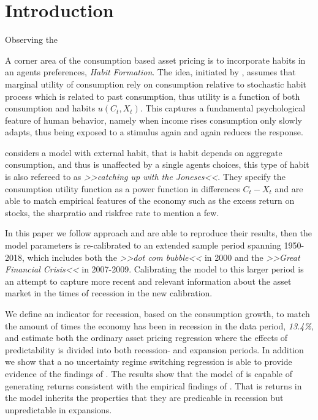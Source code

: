 \section{Introduction} \label{sec:Introduction}

Observing the 


A corner area of the consumption based asset pricing is to incorporate habits in an agents preferences, \textit{Habit Formation}. The idea, initiated by \citet{Constantinides_1990}, assumes that marginal utility of consumption rely on consumption relative to stochastic habit process which is related to past consumption, thus utility is a function of both consumption and habits $u \left(C_t, X_t \right)$. This captures a fundamental psychological feature of human behavior, namely when income rises consumption only slowly adapts, thus being exposed to a stimulus again and again reduces the response. 

\citet{Campbell1999} considers a model with external habit, that is habit depends on aggregate consumption, and thus is unaffected by a single agents choices, this type of habit is also refereed to as \textit{>>catching up with the Joneses<<}. They specify the consumption utility function as a power function in differences $C_t - X_t$ and are able to match empirical features of the economy such as the excess return on stocks, the sharpratio and riskfree rate to mention a few. 

In this paper we follow \citet{Campbell1999} approach and are able to reproduce their results, then the model parameters is re-calibrated to an extended sample period spanning  1950-2018, which includes both the \textit{>>dot com bubble<<} in 2000 and the \textit{>>Great Financial Crisis<<} in 2007-2009.
Calibrating the model to this larger period is an attempt to capture more recent and relevant information about the asset market in the times of recession in the new calibration. 

We define an indicator for recession, based on the consumption growth, to match the amount of times the economy has been in recession in the data period, \textit{13.4\%}, and estimate both the ordinary asset pricing regression where the effects of predictability is divided into both recession- and expansion periods. In addition we show that a no uncertainty regime switching regression is able to provide evidence of the findings of \citet{Henkel2011}. 
The results show that the model of \citet{Campbell1999} is capable of generating returns consistent with the empirical findings of \citet{Henkel2011}. That is returns in the model inherits the properties that they are predicable in recession but unpredictable in expansions.


